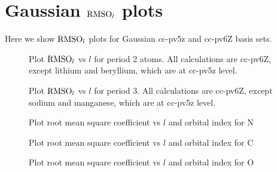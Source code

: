 \chapter{Gaussian $\text{RMSO}_l$ plots}
\label{apx:GaussianUHF}

Here we show $\text{RMSO}_l$ plots for Gaussian cc-pv5z and cc-pv6Z basis sets.

\begin{figure}
	\centering
	\caption{Plot $\text{RMSO}_l$ vs $l$ for period 2 atoms. All calculations are cc-pv6Z,
	except lithium and beryllium, which are at cc-pv5z level.}
	\label{fig:RMSO_period2_l}
\end{figure}

\begin{figure}
	\centering
	\caption{Plot $\text{RMSO}_l$ vs $l$ for period 3. All calculations are cc-pv6Z,
	except sodium and manganese, which are at cc-pv5z level.}
	\label{fig:RMSO_period3_l}
\end{figure}

\begin{figure}
	\centering
	\caption{Plot root mean square coefficient vs $l$ and orbital index for N}
	\label{fig:RMSLF_N}
\end{figure}

\begin{figure}
	\centering
	\caption{Plot root mean square coefficient vs $l$ and orbital index for C}
	\label{fig:RMSLF_C}
\end{figure}

\begin{figure}
	\centering
	\caption{Plot root mean square coefficient vs $l$ and orbital index for O}
	\label{fig:RMSLF_O}
\end{figure}


